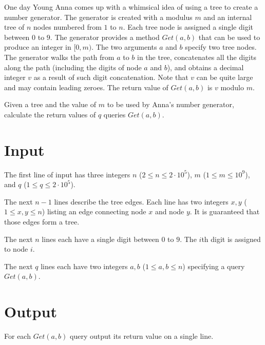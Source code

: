 
One day Young Anna comes up with a whimsical idea of using a tree to create a number generator.
The generator is created with a modulus $m$ and an internal tree of $n$ nodes numbered from $1$ to $n$.
Each tree node is assigned a single digit between $0$ to $9$.
The generator provides a method $Get(a, b)$ that can be used to produce an integer in $[0, m)$.
The two arguments $a$ and $b$ specify two tree nodes.
The generator walks the path from $a$ to $b$ in the tree, concatenates all the digits along the path (including the digits of node $a$ and $b$), and obtains a decimal integer $v$ as a result of such digit concatenation.
Note that $v$ can be quite large and may contain leading zeroes.
The return value of $Get(a, b)$ is $v$ modulo $m$.

Given a tree and the value of $m$ to be used by Anna's number generator, calculate the return values of $q$ queries $Get(a, b)$.

\section*{Input}
The first line of input has three integers $n$ ($2 \leq n \leq 2 \cdot 10^5$), $m$ ($1 \leq m \leq 10^9$), and $q$ ($1 \leq q \leq 2 \cdot 10^5$).

\noindent The next $n - 1$ lines describe the tree edges.
Each line has two integers $x, y$ ($1 \leq x, y \leq n$) listing an edge connecting node $x$ and node $y$.
It is guaranteed that those edges form a tree.

\noindent The next $n$ lines each have a single digit between $0$ to $9$.
The $i$th digit is assigned to node $i$.

\noindent The next $q$ lines each have two integers $a, b$ ($1 \leq a, b \leq n$) specifying a query $Get(a, b)$.

\section*{Output}
For each $Get(a, b)$ query output its return value on a single line.
 